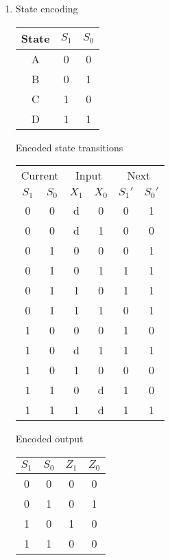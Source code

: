 \documentclass[12pt,letterpaper]{article}
\begin{document}
\begin{enumerate}
\begin{enumerate}
        \item
          State encoding

          \begin{tabular}{c | c c}
            State & $S_1$ & $S_0$ \\
            \hline
            A & 0 & 0 \\
            B & 0 & 1 \\
            C & 1 & 0 \\
            D & 1 & 1 \\
          \end{tabular}

          Encoded state transitions

          \begin{tabular}{c c | c c | c c}
            \multicolumn{2}{c}{Current} & \multicolumn{2}{|c|}{Input} & \multicolumn{2}{c}{Next}\\
            $S_1$ & $S_0$ & $X_1$ & $X_0$ & $S_1'$ & $S_0'$ \\
            \hline
            0 & 0 & d & 0 & 0 & 1 \\
            0 & 0 & d & 1 & 0 & 0 \\
            \hline
            0 & 1 & 0 & 0 & 0 & 1 \\
            0 & 1 & 0 & 1 & 1 & 1 \\
            0 & 1 & 1 & 0 & 1 & 1 \\
            0 & 1 & 1 & 1 & 0 & 1 \\
            \hline
            1 & 0 & 0 & 0 & 1 & 0 \\
            1 & 0 & d & 1 & 1 & 1 \\
            1 & 0 & 1 & 0 & 0 & 0 \\
            \hline
            1 & 1 & 0 & d & 1 & 0 \\
            1 & 1 & 1 & d & 1 & 1 \\
          \end{tabular}

          Encoded output

          \begin{tabular}{c c | c c}
            $S_1$ & $S_0$ & $Z_1$ & $Z_0$ \\
            \hline
            0 & 0 & 0 & 0 \\
            0 & 1 & 0 & 1 \\
            1 & 0 & 1 & 0 \\
            1 & 1 & 0 & 0 \\
          \end{tabular}
      \end{enumerate}

  \end{enumerate}
\end{document}
